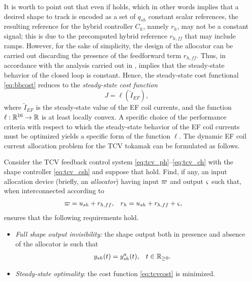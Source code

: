 It is worth to point out that even if  holds, which in other words implies that a desired shape to track is encoded as a set of $q_{sh}$ constant scalar references, the resulting reference for the hybrid controller $C_h$, namely $r_h$, may not be a constant signal; this is due to the precomputed hybrid reference $r_{h,ff}$ that may include ramps. However, for the sake of simplicity, the design of the allocator can be carried out discarding the presence of the feedforward term $r_{h,ff}$. Thus, in accordance with the analysis carried out in ,  implies that the steady-state behavior of the closed loop is constant. Hence, the steady-state cost functional \eqref{eq:bbcost} reduces to the \emph{steady-state cost function}
\begin{equation}
  \label{eq:tcvcost}
  J = \ell(\tilde{I}_{EF}),
\end{equation}
where $\tilde{I}_{EF}$ is the steady-state value of the EF coil currents, and the function $\ell : \mathbb{R}^{16} \rightarrow \mathbb{R}$ is at least locally convex. A specific choice of the performance criteria with respect to which the steady-state behavior of the EF coil currents must be optimized yields a specific form of the function $\ell$. The dynamic EF coil current allocation problem for the TCV tokamak can be formulated as follows.

\begin{problem}
  \label{prb:tcvall}
  Consider the TCV feedback control system \eqref{eq:tcv_ph}--\eqref{eq:tcv_ch} with the shape controller \eqref{eq:tcv_csh} and suppose that  hold.
  Find, if any, an input allocation device (briefly, an \emph{allocator}) having input $\varpi$ and output $\varsigma$ such that, when interconnected according to
  \begin{align}
    \label{eq:tcv_all_interconn}
    \varpi &= u_{sh} + r_{h,ff}, & r_h &= u_{sh} + r_{h,ff} + \varsigma,
  \end{align}
  ensures that the following requirements hold.
  \begin{itemize}
    \item[\emph{(I)}] \emph{Full shape output invisibility:} the shape output both in presence and absence of the allocator is such that
      \begin{align}
        \label{eq:tcv_all_inv}
        y_{sh}(t) &= y^a_{sh}(t), & t\in\mathbb{R}_{\geq 0}.
      \end{align}
    \item[\emph{(O)}] \emph{Steady-state optimality}: the cost function \eqref{eq:tcvcost} is minimized.
  \end{itemize}
  \closestatement
\end{problem}

